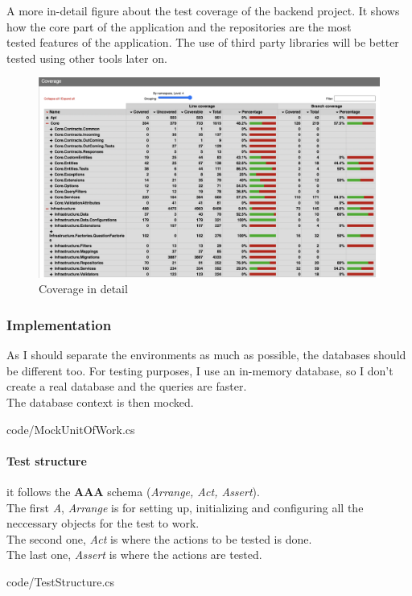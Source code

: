 A more in-detail figure about the test coverage of the backend project. It shows how the core part of the application and the repositories are the most \\
tested features of the application. The use of third party libraries will be better tested using other tools later on.
\begin{figure}[H]
    \centering
        \includegraphics[width=\textwidth]{assets/coverage_detail.png}
    \caption{Coverage in detail}
    \label{fig:test_coverage_detail}
\end{figure}

\subsubsection{Implementation}
    As I should separate the environments as much as possible, the databases should be different too. For testing purposes, I use an in-memory database, so I don't \\
    create a real database and the queries are faster. \\
    The database context is then mocked.

    
    {code/MockUnitOfWork.cs}

\paragraph{Test structure} it follows the \textbf{AAA} schema (\textit{Arrange, Act, Assert}). \\
    The first \textit{A}, \textit{Arrange} is for setting up, initializing and configuring all the neccessary objects for the test to work. \\
    The second one, \textit{Act} is where the actions to be tested is done. \\
    The last one, \textit{Assert} is where the actions are tested.
    
    {code/TestStructure.cs}

